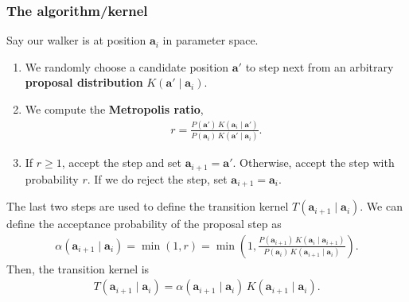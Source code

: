 \subsubsection{The algorithm/kernel}
Say our walker is at position $\mathbf{a}_i$ in parameter space.
\begin{enumerate}
\item We randomly choose a candidate position $\mathbf{a}'$ to step
  next from an arbitrary \textbf{proposal distribution}
  $K(\mathbf{a}'\mid \mathbf{a}_i)$.
\item We compute the \textbf{Metropolis ratio},
  \begin{align}
    r = \frac{P(\mathbf{a}')\,K(\mathbf{a}_i\mid \mathbf{a}')}
    {P(\mathbf{a}_i)\,K(\mathbf{a}'\mid \mathbf{a}_i)}.
  \end{align}
\item If $r \ge 1$, accept the step and set
  $\mathbf{a}_{i+1} = \mathbf{a}'$.  Otherwise, accept the step with
  probability $r$.  If we do reject the step, set
  $\mathbf{a}_{i+1} = \mathbf{a}_i$.
\end{enumerate}
The last two steps are used to define the transition kernel
$T(\mathbf{a}_{i+1}\mid \mathbf{a}_i)$.  We can define the acceptance
probability of the proposal step as
\begin{align}
\alpha(\mathbf{a}_{i+1}\mid \mathbf{a}_i) = \min(1, r) = \min\left(1, \frac{P(\mathbf{a}_{i+1})\,K(\mathbf{a}_i\mid \mathbf{a}_{i+1})}
    {P(\mathbf{a}_i)\,K(\mathbf{a}_{i+1}\mid \mathbf{a}_i)}\right).
\end{align}
Then, the transition kernel is
\begin{align}
T(\mathbf{a}_{i+1}\mid \mathbf{a}_i) = \alpha(\mathbf{a}_{i+1}\mid \mathbf{a}_i)\,K(\mathbf{a}_{i+1}\mid \mathbf{a}_i).
\end{align}


